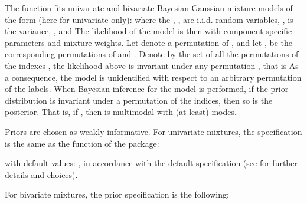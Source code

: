 \documentclass[a4paper]{book}
\begin{document}
\begin{Details}\relax
The function fits univariate and bivariate Bayesian Gaussian mixture models of the form
(here for univariate only):
where the , , are i.i.d. random variables, ,
 is the variance,  , and
The likelihood of the model is then
with  component-specific parameters and  mixture weights. Let \eqn{\nu}{} denote a permutation of , and let  ,  be the corresponding permutations of \eqn{\mu}{} and \eqn{\pi}{}. Denote by  the set of all the permutations of the indexes , the likelihood above is invariant under any permutation , that is
As a consequence, the model is unidentified with respect to an arbitrary permutation of the labels.
When Bayesian inference for the model is performed, if the prior distribution  is invariant under a permutation of the indices, then so is the posterior. That is, if , then
is multimodal with (at least)  modes.

Priors are chosen as weakly informative. For univariate mixtures,
the specification is the same as the function  of the
 package:


with default values: , in accordance with the default
specification
 (see  for further details and choices).

For bivariate mixtures, the prior specification is the following:



\end{Details}
\end{document}
